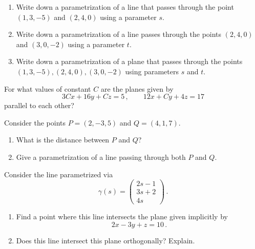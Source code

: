 \documentclass[12pt]{amsart}
\begin{document}
\begin{problem}
    \begin{enumerate}
        \item Write down a parametrization of a line that passes through the point 
            $(1,3,-5)$ and $(2,4,0)$ using a parameter $s$.
        \item Write down a parametrization of a line passes through the points $(2,4,0)$ and $(3,0,-2)$ using a parameter $t$.
        \item Write down a parametrization of a plane that passes through
        the points $(1,3,-5), (2,4,0), (3,0,-2)$ 
        using parameters $s$ and $t$.
    \end{enumerate}
\end{problem}

\begin{problem}
    For what values of constant $C$ are the planes given by
    \begin{equation*}
        3C x + 16 y + Cz = 5 \,, \qquad 12x + Cy + 4z = 17
    \end{equation*}
    parallel to each other?
\end{problem}

\begin{problem}
    Consider the points $P = (2,-3,5)$ and $Q = (4,1,7)$.
    \begin{enumerate}
        \item What is the distance between $P$ and $Q$?
        \item Give a parametrization of a line passing through 
            both $P$ and $Q$.
    \end{enumerate}
\end{problem}

\begin{problem}
    Consider the line parametrized via
    \begin{equation*}
        \gamma(s) = \begin{pmatrix}
            2s - 1 \\ 3s + 2 \\ 4s
        \end{pmatrix} \,.
    \end{equation*}
    \begin{enumerate}
        \item Find a point where this line intersects the plane given 
            implicitly by 
            \begin{equation*}
                2x - 3y + z = 10 \,.
            \end{equation*}
        \item Does this line intersect this plane orthogonally? Explain.
    \end{enumerate}
\end{problem}
\end{document}

